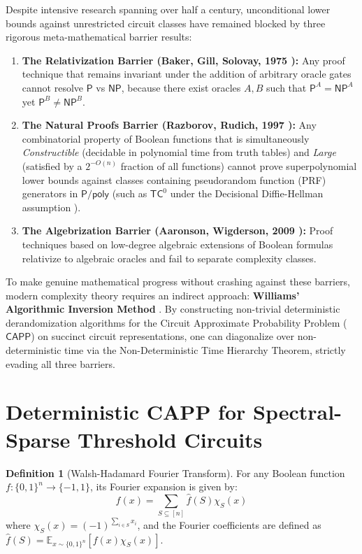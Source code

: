 \documentclass[11pt,a4paper]{article}
\theoremstyle{definition}
\newtheorem{definition}[theorem]{Definition}
\theoremstyle{remark}
\newcommand{\NP}{\mathsf{NP}}
\newcommand{\PP}{\mathsf{P}}
\newcommand{\Ppoly}{\mathsf{P/poly}}
\newcommand{\TC}{\mathsf{TC}}
\newcommand{\CAPP}{\mathsf{CAPP}}
\newcommand{\E}{\mathbb{E}}
\begin{document}
Despite intensive research spanning over half a century, unconditional lower bounds against unrestricted circuit classes have remained blocked by three rigorous meta-mathematical barrier results:
\begin{enumerate}
    \item \textbf{The Relativization Barrier (Baker, Gill, Solovay, 1975 \cite{bgs75}):} Any proof technique that remains invariant under the addition of arbitrary oracle gates cannot resolve $\PP$ vs $\NP$, because there exist oracles $A, B$ such that $\PP^A = \NP^A$ yet $\PP^B \neq \NP^B$.
    \item \textbf{The Natural Proofs Barrier (Razborov, Rudich, 1997 \cite{rr97}):} Any combinatorial property of Boolean functions that is simultaneously \emph{Constructible} (decidable in polynomial time from truth tables) and \emph{Large} (satisfied by a $2^{-O(n)}$ fraction of all functions) cannot prove superpolynomial lower bounds against classes containing pseudorandom function (PRF) generators in $\Ppoly$ (such as $\TC^0$ under the Decisional Diffie-Hellman assumption \cite{nr04}).
    \item \textbf{The Algebrization Barrier (Aaronson, Wigderson, 2009 \cite{aw09}):} Proof techniques based on low-degree algebraic extensions of Boolean formulas relativize to algebraic oracles and fail to separate complexity classes.
\end{enumerate}

To make genuine mathematical progress without crashing against these barriers, modern complexity theory requires an indirect approach: \textbf{Williams' Algorithmic Inversion Method} \cite{williams11,williams14}. By constructing non-trivial deterministic derandomization algorithms for the Circuit Approximate Probability Problem ($\CAPP$) on succinct circuit representations, one can diagonalize over non-deterministic time via the Non-Deterministic Time Hierarchy Theorem, strictly evading all three barriers.

\section{Deterministic CAPP for Spectral-Sparse Threshold Circuits}

\begin{definition}[Walsh-Hadamard Fourier Transform]
For any Boolean function $f : \{0,1\}^n \to \{-1, 1\}$, its Fourier expansion is given by:
\[
f(x) = \sum_{S \subseteq [n]} \hat{f}(S) \chi_S(x)
\]
where $\chi_S(x) = (-1)^{\sum_{i \in S} x_i}$, and the Fourier coefficients are defined as $\hat{f}(S) = \E_{x \sim \{0,1\}^n} [f(x) \chi_S(x)]$.
\end{definition}
\end{document}

